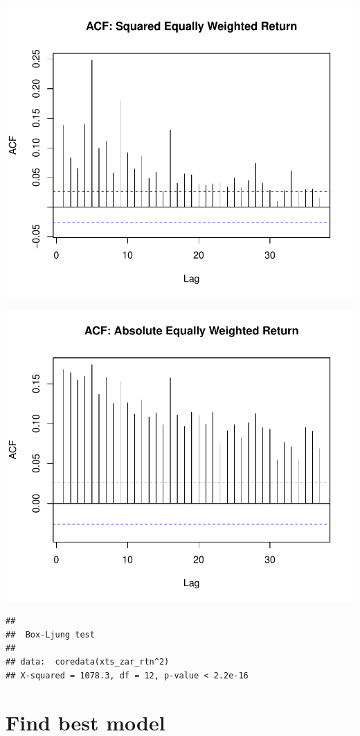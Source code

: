 \documentclass[11pt,preprint, authoryear]{elsarticle}
\numberwithin{equation}{section}
\numberwithin{figure}{section}
\numberwithin{table}{section}
\begin{document}
\includegraphics{Question5_files/figure-latex/unnamed-chunk-7-1.pdf}

\includegraphics{Question5_files/figure-latex/unnamed-chunk-8-1.pdf}

\begin{verbatim}
## 
##  Box-Ljung test
## 
## data:  coredata(xts_zar_rtn^2)
## X-squared = 1078.3, df = 12, p-value < 2.2e-16
\end{verbatim}

\hypertarget{find-best-model}{%
\section{Find best model}\label{find-best-model}}
\end{document}

